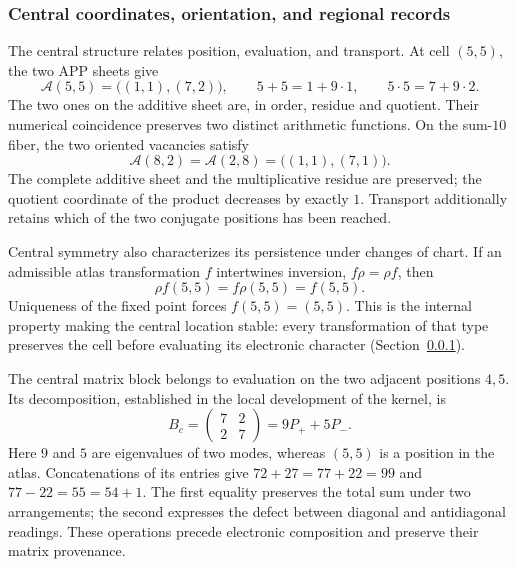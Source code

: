 \subsubsection{Central coordinates, orientation, and regional records}
\label{el-centro:registros}

The central structure relates position, evaluation, and transport. At
cell \((5,5)\), the two APP sheets give
\begin{equation}
 \mathcal A(5,5)=\bigl((1,1),(7,2)\bigr),\qquad
 5+5=1+9\cdot1,\qquad5\cdot5=7+9\cdot2.
 \label{el-centro:app}
\end{equation}
The two ones on the additive sheet are, in order, residue and quotient.
Their numerical coincidence preserves two distinct arithmetic functions.
On the sum-\(10\) fiber, the two oriented vacancies satisfy
\begin{equation}
 \mathcal A(8,2)=\mathcal A(2,8)=\bigl((1,1),(7,1)\bigr).
 \label{el-centro:vacancias}
\end{equation}
The complete additive sheet and the multiplicative residue are preserved;
the quotient coordinate of the product decreases by exactly
\(1\). Transport additionally retains which of the two conjugate
positions has been reached.



Central symmetry also characterizes its persistence under changes of
chart. If an admissible atlas transformation \(f\) intertwines
inversion, \(f\rho=\rho f\), then
\[
 \rho f(5,5)=f\rho(5,5)=f(5,5).
\]
Uniqueness of the fixed point forces \(f(5,5)=(5,5)\). This is the
internal property making the central location stable: every
transformation of that type preserves the cell before evaluating its
electronic character (Section~\ref{el-centro:registros}).

The central matrix block belongs to evaluation on the two
adjacent positions \(4,5\). Its decomposition, established in the
local development of the kernel, is
\[
 B_c=\begin{pmatrix}7&2\\2&7\end{pmatrix}=9P_++5P_-.
\]
Here \(9\) and \(5\) are eigenvalues of two modes, whereas
\((5,5)\) is a position in the atlas. Concatenations of its
entries give \(72+27=77+22=99\) and
\(77-22=55=54+1\). The first equality preserves the total sum under
two arrangements; the second expresses the defect between diagonal
and antidiagonal readings. These operations precede electronic
composition and preserve their matrix provenance.

